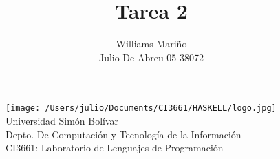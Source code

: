 \documentclass[12pt,a4paper,spanish]{article}
\begin{document}
\begin{figure}
  \centering
    \texttt{[image: /Users/julio/Documents/CI3661/HASKELL/logo.jpg]}
     \\ Universidad Sim\'on Bol\'ivar
     \\ Depto. De Computaci\'on y Tecnolog\'ia de la Informaci\'on
     \\ CI3661: Laboratorio de Lenguajes de Programaci\'on 
\end{figure} 

\title{Tarea 2}
\author{Williams Mari\~no\\
        Julio De Abreu 05-38072}

\maketitle
\newpage
\end{document}
